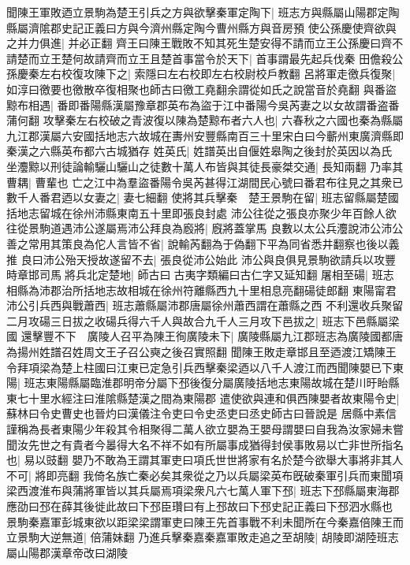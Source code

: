 聞陳王軍敗迺立景駒為楚王引兵之方與欲擊秦軍定陶下|{
	班志方與縣屬山陽郡定陶縣屬濟隂郡史記正義曰方與今濟州縣定陶今曹州縣方與音房預}
使公孫慶使齊欲與之并力俱進|{
	并必正翻}
齊王曰陳王戰敗不知其死生楚安得不請而立王公孫慶曰齊不請楚而立王楚何故請齊而立王且楚首事當令於天下|{
	首事謂最先起兵伐秦}
田儋殺公孫慶秦左右校復攻陳下之|{
	索隱曰左右校即左右校尉校戶教翻}
呂將軍走徼兵復聚|{
	如淳曰徼要也徼散卒復相聚也師古曰徼工堯翻余謂從如氏之說當音於堯翻}
與番盜黥布相遇|{
	番即番陽縣漢屬豫章郡英布為盜于江中番陽今吳芮妻之以女故謂番盗番蒲何翻}
攻擊秦左右校破之青波復以陳為楚黥布者六人也|{
	六春秋之六國也秦為縣屬九江郡漢屬六安國括地志六故城在夀州安豐縣南百三十里宋白曰今蘄州東廣濟縣即秦漢之六縣英布都六古城猶存}
姓英氏|{
	姓譜英出自偃姓皋陶之後封於英因以為氏}
坐灋黥以刑徒論輸驪山驪山之徒數十萬人布皆與其徒長豪桀交通|{
	長知兩翻}
乃率其曹耦|{
	曹輩也}
亡之江中為羣盜番陽令吳芮甚得江湖間民心號曰番君布往見之其衆已數千人番君迺以女妻之|{
	妻七細翻}
使將其兵擊秦　楚王景駒在留|{
	班志留縣屬楚國括地志留城在徐州沛縣東南五十里即張良封處}
沛公往從之張良亦聚少年百餘人欲往從景駒道遇沛公遂屬焉沛公拜良為廏將|{
	廐將蓋掌馬}
良數以太公兵灋說沛公沛公善之常用其策良為佗人言皆不省|{
	說輸芮翻為于偽翻下平為同省悉井翻察也後以義推}
良曰沛公殆天授故遂留不去|{
	張良從沛公始此}
沛公與良俱見景駒欲請兵以攻豐時章邯司馬將兵北定楚地|{
	師古曰古夷字類編曰古仁字又延知翻}
屠相至碭|{
	班志相縣為沛郡治所括地志故相城在徐州符離縣西九十里相息亮翻碭徒郎翻}
東陽甯君沛公引兵西與戰蕭西|{
	班志蕭縣屬沛郡唐屬徐州蕭西謂在蕭縣之西}
不利還收兵聚留二月攻碭三日拔之收碭兵得六千人與故合九千人三月攻下邑拔之|{
	班志下邑縣屬梁國}
還擊豐不下　廣陵人召平為陳王徇廣陵未下|{
	廣陵縣屬九江郡班志為廣陵國都唐為揚州姓譜召姓周文王子召公奭之後召實照翻}
聞陳王敗走章邯且至迺渡江矯陳王令拜項梁為楚上柱國曰江東已定急引兵西擊秦梁迺以八千人渡江而西聞陳嬰已下東陽|{
	班志東陽縣屬臨淮郡明帝分屬下邳後復分屬廣陵括地志東陽故城在楚川旴眙縣東七十里水經注曰淮隂縣楚漢之間為東陽郡}
遣使欲與連和俱西陳嬰者故東陽令史|{
	蘇林曰令史曹史也晉灼曰漢儀注令吏曰令史丞吏曰丞史師古曰晉說是}
居縣中素信謹稱為長者東陽少年殺其令相聚得二萬人欲立嬰為王嬰母謂嬰曰自我為汝家婦未嘗聞汝先世之有貴者今㬥得大名不祥不如有所屬事成猶得封侯事敗易以亡非世所指名也|{
	易以豉翻}
嬰乃不敢為王謂其軍吏曰項氏世世將家有名於楚今欲舉大事將非其人不可|{
	將即亮翻}
我倚名族亡秦必矣其衆從之乃以兵屬梁英布旣破秦軍引兵而東聞項梁西渡淮布與蒲將軍皆以其兵屬焉項梁衆凡六七萬人軍下邳|{
	班志下邳縣屬東海郡應劭曰邳在薛其後徙此故曰下邳臣瓚曰有上邳故曰下邳史記正義曰下邳泗水縣也}
景駒秦嘉軍彭城東欲以距梁梁謂軍吏曰陳王先首事戰不利未聞所在今秦嘉倍陳王而立景駒大逆無道|{
	倍蒲妹翻}
乃進兵擊秦嘉秦嘉軍敗走追之至胡陵|{
	胡陵即湖陸班志屬山陽郡漢章帝改曰湖陵}
